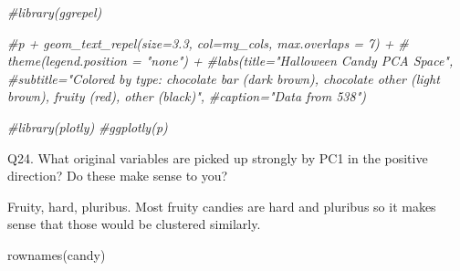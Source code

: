 \documentclass[
]{article}
\newenvironment{Shaded}{\begin{snugshade}}{\end{snugshade}}
\newcommand{\CommentTok}[1]{\textcolor[rgb]{0.56,0.35,0.01}{\textit{#1}}}
\newcommand{\FunctionTok}[1]{\textcolor[rgb]{0.00,0.00,0.00}{#1}}
\newcommand{\NormalTok}[1]{#1}
\begin{document}
\begin{Shaded}
\begin{Highlighting}[]
\CommentTok{\#library(ggrepel)}

\CommentTok{\#p + geom\_text\_repel(size=3.3, col=my\_cols, max.overlaps = 7)  + }
 \CommentTok{\# theme(legend.position = "none") +}
  \CommentTok{\#labs(title="Halloween Candy PCA Space",}
       \CommentTok{\#subtitle="Colored by type: chocolate bar (dark brown), chocolate other (light  brown), fruity (red), other (black)",}
       \CommentTok{\#caption="Data from 538")}
\end{Highlighting}
\end{Shaded}

\begin{Shaded}
\begin{Highlighting}[]
\CommentTok{\#library(plotly)}
\CommentTok{\#ggplotly(p)}
\end{Highlighting}
\end{Shaded}

\begin{Shaded}
\end{Shaded}

Q24. What original variables are picked up strongly by PC1 in the
positive direction? Do these make sense to you?

Fruity, hard, pluribus. Most fruity candies are hard and pluribus so it
makes sense that those would be clustered similarly.

\begin{Shaded}
\begin{Highlighting}[]
\FunctionTok{rownames}\NormalTok{(candy)}
\end{Highlighting}
\end{Shaded}
\end{document}
